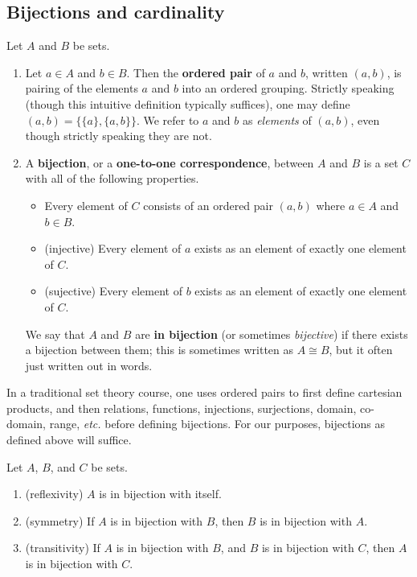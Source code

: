 \subsection{Bijections and cardinality}
\begin{definition} \label{def:bijection} Let $A$ and $B$ be sets.
\begin{enumerate}
    \item Let $a\in A$ and $b\in B$.  Then the \textbf{ordered pair} of $a$ and $b$, written $(a, b)$, is pairing of the elements $a$ and $b$ into an ordered grouping.  Strictly speaking (though this intuitive definition typically suffices), one may define $(a, b)=\{\{a\}, \{a, b\}\}$.  We refer to $a$ and $b$ as \textit{elements} of $(a,b)$, even though strictly speaking they are not.
    \item A \textbf{bijection}, or a \textbf{one-to-one correspondence}, between $A$ and $B$ is a set $C$ with all of the following properties.
    \begin{itemize}
        \item Every element of $C$ consists of an ordered pair $(a,b)$ where $a \in A$ and $b \in B$.
        \item (injective) Every element of $a$ exists as an element of exactly one element of $C$.
        \item (sujective) Every element of $b$ exists as an element of exactly one element of $C$.
    \end{itemize}
    We say that $A$ and $B$ are \textbf{in bijection} (or sometimes \textit{bijective}) if there exists a bijection between them; this is sometimes written as $A \cong B$, but it often just written out in words.
\end{enumerate}
\end{definition}

\begin{remark} In a traditional set theory course, one uses ordered pairs to first define cartesian products, and then relations, functions, injections, surjections, domain, co-domain, range, \textit{etc.} before defining bijections. For our purposes, bijections as defined above will suffice.
\end{remark}

\begin{theorem} Let $A$, $B$, and $C$ be sets.
\begin{enumerate}
    \item (reflexivity) $A$ is in bijection with itself.
    \item (symmetry) If $A$ is in bijection with $B$, then $B$ is in bijection with $A$.
    \item (transitivity) If $A$ is in bijection with $B$, and $B$ is in bijection with $C$, then $A$ is in bijection with $C$.
\end{enumerate}\end{theorem}


